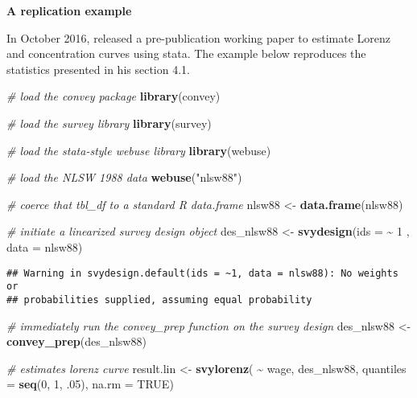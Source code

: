 \documentclass[
]{book}
\newenvironment{Shaded}{\begin{snugshade}}{\end{snugshade}}
\newcommand{\AttributeTok}[1]{\textcolor[rgb]{0.13,0.29,0.53}{#1}}
\newcommand{\CommentTok}[1]{\textcolor[rgb]{0.56,0.35,0.01}{\textit{#1}}}
\newcommand{\ConstantTok}[1]{\textcolor[rgb]{0.56,0.35,0.01}{#1}}
\newcommand{\DecValTok}[1]{\textcolor[rgb]{0.00,0.00,0.81}{#1}}
\newcommand{\FunctionTok}[1]{\textcolor[rgb]{0.13,0.29,0.53}{\textbf{#1}}}
\newcommand{\NormalTok}[1]{#1}
\newcommand{\OtherTok}[1]{\textcolor[rgb]{0.56,0.35,0.01}{#1}}
\newcommand{\SpecialCharTok}[1]{\textcolor[rgb]{0.81,0.36,0.00}{\textbf{#1}}}
\newcommand{\StringTok}[1]{\textcolor[rgb]{0.31,0.60,0.02}{#1}}
\begin{document}
\textbf{A replication example}

In October 2016, \autocite{jann2016} released a pre-publication working paper to estimate Lorenz and concentration curves using stata. The example below reproduces the statistics presented in his section 4.1.

\begin{Shaded}
\begin{Highlighting}[]
\CommentTok{\# load the convey package}
\FunctionTok{library}\NormalTok{(convey)}

\CommentTok{\# load the survey library}
\FunctionTok{library}\NormalTok{(survey)}

\CommentTok{\# load the stata{-}style webuse library}
\FunctionTok{library}\NormalTok{(webuse)}

\CommentTok{\# load the NLSW 1988 data}
\FunctionTok{webuse}\NormalTok{(}\StringTok{"nlsw88"}\NormalTok{)}

\CommentTok{\# coerce that \textasciigrave{}tbl\_df\textasciigrave{} to a standard R \textasciigrave{}data.frame\textasciigrave{}}
\NormalTok{nlsw88 }\OtherTok{\textless{}{-}} \FunctionTok{data.frame}\NormalTok{(nlsw88)}

\CommentTok{\# initiate a linearized survey design object}
\NormalTok{des\_nlsw88 }\OtherTok{\textless{}{-}} \FunctionTok{svydesign}\NormalTok{(}\AttributeTok{ids =} \SpecialCharTok{\textasciitilde{}} \DecValTok{1}\NormalTok{ , }\AttributeTok{data =}\NormalTok{ nlsw88)}
\end{Highlighting}
\end{Shaded}

\begin{verbatim}
## Warning in svydesign.default(ids = ~1, data = nlsw88): No weights or
## probabilities supplied, assuming equal probability
\end{verbatim}

\begin{Shaded}
\begin{Highlighting}[]
\CommentTok{\# immediately run the \textasciigrave{}convey\_prep\textasciigrave{} function on the survey design}
\NormalTok{des\_nlsw88 }\OtherTok{\textless{}{-}} \FunctionTok{convey\_prep}\NormalTok{(des\_nlsw88)}

\CommentTok{\# estimates lorenz curve}
\NormalTok{result.lin }\OtherTok{\textless{}{-}}
  \FunctionTok{svylorenz}\NormalTok{( }\SpecialCharTok{\textasciitilde{}}\NormalTok{ wage,}
\NormalTok{             des\_nlsw88,}
             \AttributeTok{quantiles =} \FunctionTok{seq}\NormalTok{(}\DecValTok{0}\NormalTok{, }\DecValTok{1}\NormalTok{, .}\DecValTok{05}\NormalTok{),}
             \AttributeTok{na.rm =} \ConstantTok{TRUE}\NormalTok{)}
\end{Highlighting}
\end{Shaded}
\end{document}
